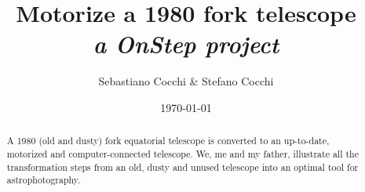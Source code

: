 \documentclass{article}
\title{\textbf{Motorize a 1980 fork telescope}\\\textit{a OnStep project}}
\author{Sebastiano Cocchi \& Stefano Cocchi}
\date{\today}
\begin{document}
    
    \maketitle

    \begin{abstract}
        A 1980 (old and dusty) fork equatorial telescope is converted to an up-to-date, motorized and computer-connected telescope.
        We, me and my father, illustrate all the transformation steps from an old, dusty and unused telescope into an optimal tool for astrophotography.
    \end{abstract}

\end{document}
